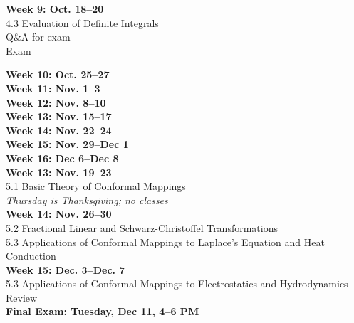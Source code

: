 \documentclass[11pt]{article}
\begin{document}
{\bf Week 9: Oct. 18--20}\\
4.3 Evaluation of Definite Integrals\\
Q\&A for exam\\
Exam

{\bf Week 10: Oct. 25--27}\\

{\bf Week 11: Nov. 1--3}\\

{\bf Week 12: Nov. 8--10}\\

{\bf Week 13: Nov. 15--17}\\

{\bf Week 14: Nov. 22--24}\\

{\bf Week 15: Nov. 29--Dec 1}\\

{\bf Week 16: Dec 6--Dec 8}\\


{\bf Week 13: Nov. 19--23}\\
5.1 Basic Theory of Conformal Mappings\\
{\it Thursday is Thanksgiving; no classes}\\

{\bf Week 14: Nov. 26--30}\\ 
5.2 Fractional Linear and Schwarz-Christoffel Transformations \\
5.3 Applications of Conformal Mappings to Laplace's Equation and  Heat  Conduction\\

{\bf Week 15: Dec. 3--Dec. 7}\\ 
5.3 Applications of Conformal Mappings to Electrostatics and Hydrodynamics\\
Review\\   

{\bf Final Exam: Tuesday, Dec 11, 4--6 PM}
\end{document}
